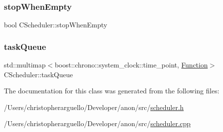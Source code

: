 \mbox{\label{class_c_scheduler_a78e214ee8c89bfc8083cb95261ebbc6f}} 
\subsubsection{\texorpdfstring{stop\+When\+Empty}{stopWhenEmpty}}
{\footnotesize\ttfamily bool C\+Scheduler\+::stop\+When\+Empty\hspace{0.3cm}{\ttfamily [private]}}

\mbox{\label{class_c_scheduler_a206a499765bd27e5aaff4c4ba2255f91}} 
\subsubsection{\texorpdfstring{task\+Queue}{taskQueue}}
{\footnotesize\ttfamily std\+::multimap$<$boost\+::chrono\+::system\+\_\+clock\+::time\+\_\+point, \mbox{\hyperlink{class_c_scheduler_af0202f526eeef71defb156dc06f70279}{Function}}$>$ C\+Scheduler\+::task\+Queue\hspace{0.3cm}{\ttfamily [private]}}



The documentation for this class was generated from the following files\+:\begin{DoxyCompactItemize}
\item 
/\+Users/christopherarguello/\+Developer/anon/src/\mbox{\hyperlink{scheduler_8h}{scheduler.\+h}}\item 
/\+Users/christopherarguello/\+Developer/anon/src/\mbox{\hyperlink{scheduler_8cpp}{scheduler.\+cpp}}\end{DoxyCompactItemize}
